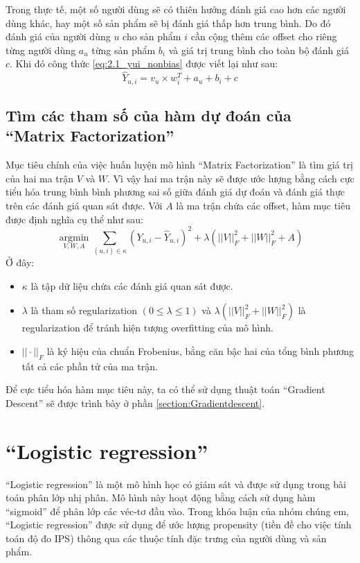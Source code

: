 Trong thực tế, một số người dùng sẽ có thiên hướng đánh giá cao hơn các người dùng khác, hay một số sản phẩm sẽ bị đánh giá thấp hơn trung bình. Do đó đánh giá của người dùng $u$ cho sản phẩm $i$ cần cộng thêm các offset cho riêng từng người dùng $a_u$ từng sản phẩm $b_i$ và giá trị trung bình cho toàn bộ đánh giá $c$. Khi đó công thức \ref{eq:2.1_yui_nonbias} được viết lại như sau:
\begin{equation}
\label{eq:2.1_yui_bias}
    \hat{Y}_{u,i} = v_{u}\times w_i^{T} + a_u + b_i + c
\end{equation}
\subsection{Tìm các tham số của hàm dự đoán của ``Matrix Factorization''}
Mục tiêu chính của việc huấn luyện mô hình ``Matrix Factorization'' là tìm giá trị của hai ma trận $V$ và $W$. Vì vậy hai ma trận này sẽ được ước lượng bằng cách cực tiểu hóa trung bình bình phương sai số giữa đánh giá dự đoán và đánh giá thực trên các đánh giá quan sát được. Với $A$ là ma trận chứa các offset, hàm mục tiêu được định nghĩa cụ thể như sau:
\begin{equation}
\label{eq:2.1_objective}
    \operatorname*{argmin}_{V,W,A} \sum_{(u,i)\in\kappa} (Y_{u,i} - \hat{Y}_{u,i})^2 + \lambda(||V||_{F}^2 + ||W||_{F}^2+A)
\end{equation}
Ở đây: 
\begin{itemize}
    \item $\kappa$ là tập dữ liệu chứa các đánh giá quan sát được.
    \item $\lambda$ là tham số regularization $(0 \leq \lambda \leq 1)$ và $\lambda(||V||_{F}^2 + ||W||_{F}^2)$ là regularization để tránh hiện tượng overfitting của mô hình.
    \item $||\cdot||_{F}$ là ký hiệu của chuẩn Frobenius, bằng căn bậc hai của tổng bình phương tất cả các phần tử của ma trận.
\end{itemize}

Để cực tiểu hóa hàm mục tiêu này, ta có thể sử dụng thuật toán ``Gradient Descent'' sẽ được trình bày ở phần \ref{section:Gradientdescent}.

\section{``Logistic regression''}
``Logistic regression'' là một mô hình học có giám sát và được sử dụng trong bài toán phân lớp nhị phân. Mô hình này hoạt động bằng cách sử dụng hàm ``sigmoid'' để phân lớp các véc-tơ đầu vào. Trong khóa luận của nhóm chúng em, ``Logistic regression'' được sử dụng để ước lượng propensity (tiền đề cho việc tính toán độ đo IPS) thông qua các thuộc tính đặc trưng của người dùng và sản phẩm.

